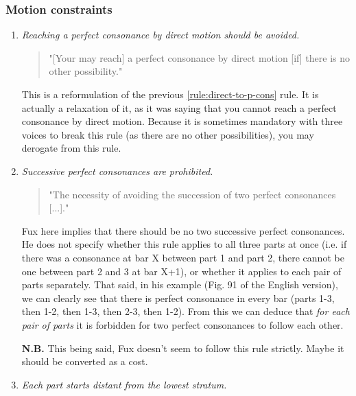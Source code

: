 \subsubsection{Motion constraints}
\begin{enumerate}[wide, label=\bfseries 1.P\arabic*]
    \item\label{rule:direct-to-p-cons} \reddot \textit{Reaching a perfect consonance by direct motion should be avoided.}

    \begin{quotation}
    "[Your may reach] a perfect consonance by direct motion [if] there is no other possibility."
    \textcite[p.77]{GaPEng}
    \end{quotation}

    This is a reformulation of the previous \ref{rule:direct-to-p-cons} rule. It is actually a relaxation of it, as it was saying that you cannot reach a perfect consonance by direct motion. Because it is sometimes mandatory with three voices to break this rule (as there are no other possibilities), you may derogate from this rule. 

\setcounter{enumi}{3} %
    \item\label{rule:succ-p-cons} \reddot  \textit{Successive perfect consonances are prohibited.}

    \begin{quotation}
    "The necessity of avoiding the succession of two perfect consonances [...]."
    \textcite[p.72]{GaPEng}
    \end{quotation}

    Fux here implies that there should be no two successive perfect consonances. He does not specify whether this rule applies to all three parts at once (i.e. if there was a consonance at bar X between part 1 and part 2, there cannot be one between part 2 and 3 at bar X+1), or whether it applies to each pair of parts separately. That said, in his example (Fig. 91 of the English version), we can clearly see that there is perfect consonance in every bar (parts 1-3, then 1-2, then 1-3, then 2-3, then 1-2). From this we can deduce that \textit{for each pair of parts} it is forbidden for two perfect consonances to follow each other.

    \textbf{N.B.} This being said, Fux doesn't seem to follow this rule strictly. Maybe it should be converted as a cost. 
    
    \item\label{rule:start-distant} \reddot \textit{Each part starts distant from the lowest stratum.}


\end{enumerate}
